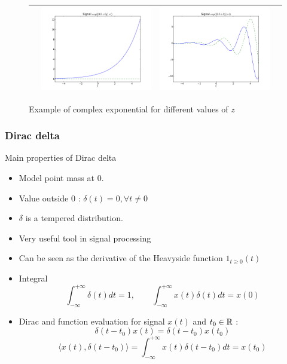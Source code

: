 \begin{figure}[ht]
\begin{tabular}{|c|ccc|}
    & \includegraphics[width=.25\linewidth]{imgs/sig_conv/sig_exp10.pdf}
    & \includegraphics[width=.25\linewidth]{imgs/sig_conv/sig_exp11.pdf}\\
\hline
  \end{tabular}
  \caption{Example of complex exponential for different values of $z$}
  \label{fig:label}
\end{figure}

\subsubsection{Dirac delta}


\begin{block}{Main properties of Dirac delta}


  \begin{itemize}
    \item Model point mass at $0$.
    \item Value outside $0$ :  $\delta(t)=0, \forall t\neq 0$ 
    \item $\delta$ is a tempered distribution. %
    \item Very useful tool in signal processing
    \item Can be seen as the derivative of the Heavyside function $1_{t\geq 0}(t)$
    \item Integral
    \begin{equation}
      \label{eq:intdirac}
      \int_{-\infty}^{+\infty}\delta(t)dt=1 ,\qquad \int_{-\infty}^{+\infty}x(t)\delta(t)dt=x(0)
    \end{equation}
    \item Dirac and function evaluation for signal $x(t)$ and $t_0\in\mathbb{R}$ :
      $$\delta(t-t_0)x(t)=\delta(t-t_0)x(t_0) $$
    \begin{equation}
      \label{eq:diraceval}
      \langle  x(t) , \delta(t-t_0)\rangle=\int_{-\infty}^{+\infty}x(t)\delta(t-t_0)dt=x(t_0)
    \end{equation}
  
  \end{itemize}
  
  
  \end{block}

